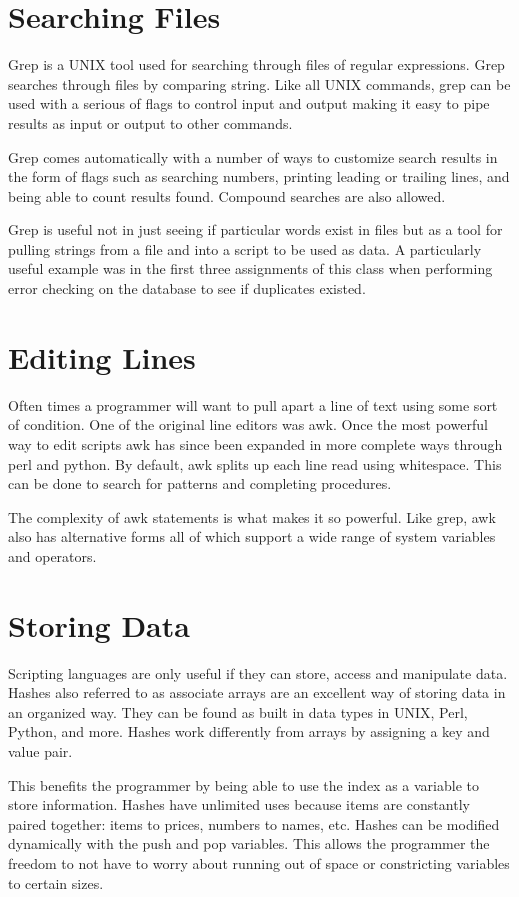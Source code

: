 \documentclass[11pt]{paper}
\begin{document}
\section{Searching Files}
Grep is a UNIX tool used for searching through files of regular expressions. Grep searches through files by comparing string. Like all UNIX commands, grep can be used with a serious of flags to control input and output making it easy to pipe results as input or output to other commands.

\indent
Grep comes automatically with a number of ways to customize search results in the form of flags such as searching numbers, printing leading or trailing lines, and being able to count results found. Compound searches are also allowed. 

\indent
Grep is useful not in just seeing if particular words exist in files but as a tool for pulling strings from a file and into a script to be used as data. A particularly useful example was in the first three assignments of this class when performing error checking on the database to see if duplicates existed. 

\section{Editing Lines}
Often times a programmer will want to pull apart a line of text using some sort of condition. One of the original line editors was awk. Once the most powerful way to edit scripts awk has since been expanded in more complete ways through perl and python. By default, awk splits up each line read using whitespace. This can be done to search for patterns and completing procedures. 

\indent
The complexity of awk statements is what makes it so powerful. Like grep, awk also has alternative forms all of which support a wide range of system variables and operators. 

\section{Storing Data}
Scripting languages are only useful if they can store, access and manipulate data. Hashes also referred to as associate arrays are an excellent way of storing data in an organized way.  They can be found as built in data types in UNIX, Perl, Python, and more. Hashes work differently from arrays by assigning a key and value pair. 

\indent
This benefits the programmer by being able to use the index as a variable to store information. Hashes have unlimited uses because items are constantly paired together: items to prices, numbers to names, etc. Hashes can be modified dynamically with the push and pop variables. This allows the programmer the freedom to not have to worry about running out of space or constricting variables to certain sizes. 
\end{document}
